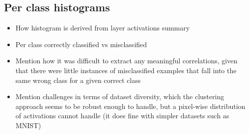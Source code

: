 \subsection{Per class histograms}


\begin{itemize}
\item How histogram is derived from layer activations summary
\item Per class correctly classified vs misclassified
\item Mention how it was difficult to extract any meaningful correlations, given that there were little instances of misclassified examples that fall into the same wrong class for a given correct class
\item Mention challenges in terms of dataset diversity, which the clustering approach seems to be robust enough to handle, but a pixel-wise distribution of activations cannot handle (it does fine with simpler datasets such as MNIST)
\end{itemize}